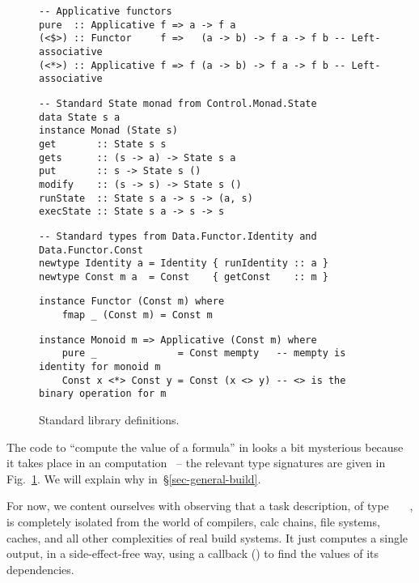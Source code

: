 \begin{figure}
\begin{verbatim}
-- Applicative functors
pure  :: Applicative f => a -> f a
(<$>) :: Functor     f =>   (a -> b) -> f a -> f b -- Left-associative
(<*>) :: Applicative f => f (a -> b) -> f a -> f b -- Left-associative
\end{verbatim}
\vspace{1mm}
\begin{verbatim}
-- Standard State monad from Control.Monad.State
data State s a
instance Monad (State s)
get       :: State s s
gets      :: (s -> a) -> State s a
put       :: s -> State s ()
modify    :: (s -> s) -> State s ()
runState  :: State s a -> s -> (a, s)
execState :: State s a -> s -> s
\end{verbatim}
\vspace{1mm}
\begin{verbatim}
-- Standard types from Data.Functor.Identity and Data.Functor.Const
newtype Identity a = Identity { runIdentity :: a }
newtype Const m a  = Const    { getConst    :: m }
\end{verbatim}
\vspace{1mm}
\begin{verbatim}
instance Functor (Const m) where
    fmap _ (Const m) = Const m
\end{verbatim}
\vspace{1mm}
\begin{verbatim}
instance Monoid m => Applicative (Const m) where
    pure _              = Const mempty   -- mempty is identity for monoid m
    Const x <*> Const y = Const (x <> y) -- <> is the binary operation for m
\end{verbatim}
\caption{Standard library definitions.}\label{fig-stdlib}
\end{figure}

The code to ``compute the value of a formula'' in  looks a bit
mysterious because it takes place in an 
computation~\cite{mcbride2008applicative} -- the relevant type signatures are
given in Fig.~\ref{fig-stdlib}. We will explain why in~\S\ref{sec-general-build}.

For now, we content ourselves with observing that a task description, of type
~~~, is completely isolated from the world of
compilers, calc chains, file systems, caches, and all other complexities of real
build systems. It just computes a single output, in a side-effect-free way,
using a callback () to find the values of its dependencies.

